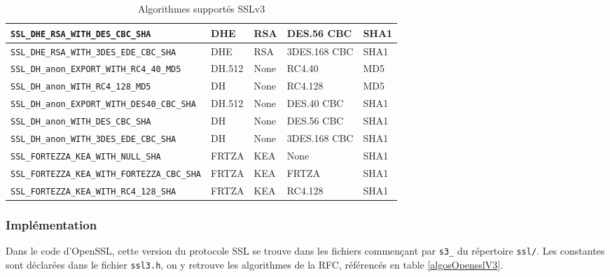 \begin{table}[H]
\begin{tabularx}{17cm}{|l|l|l|X|l|}
\hline
\verb+SSL_DHE_RSA_WITH_DES_CBC_SHA+ & DHE&RSA&DES.56 CBC&SHA1\\
\hline
\verb+SSL_DHE_RSA_WITH_3DES_EDE_CBC_SHA+ & DHE&RSA&3DES.168 CBC&SHA1\\
\hline 
\verb+SSL_DH_anon_EXPORT_WITH_RC4_40_MD5+ & DH.512&None&RC4.40&MD5\\
\hline
\verb+SSL_DH_anon_WITH_RC4_128_MD5+ & DH&None&RC4.128&MD5\\
\hline
\verb+SSL_DH_anon_EXPORT_WITH_DES40_CBC_SHA+ & DH.512&None&DES.40 CBC&SHA1\\
\hline
\verb+SSL_DH_anon_WITH_DES_CBC_SHA+& DH	&None	&DES.56	CBC&SHA1\\
\hline
\verb+SSL_DH_anon_WITH_3DES_EDE_CBC_SHA+ & DH	&None	&3DES.168 CBC&	SHA1\\
\hline
\verb+SSL_FORTEZZA_KEA_WITH_NULL_SHA+ & FRTZA&	KEA&	None&	SHA1\\
\hline
\verb+SSL_FORTEZZA_KEA_WITH_FORTEZZA_CBC_SHA+ & FRTZA & KEA & FRTZA& SHA1\\
\hline
\verb+SSL_FORTEZZA_KEA_WITH_RC4_128_SHA+ & FRTZA	&KEA&	RC4.128	&SHA1\\
\hline
\end{tabularx}
\caption{Algorithmes supportés SSLv3}
\label{algosV3}
\end{table}


\subsubsection{Implémentation}

Dans le code d'OpenSSL, cette version du protocole SSL se trouve dans les fichiers commençant par \verb+s3_+ du répertoire \verb+ssl/+. Les constantes sont déclarées dans le fichier \verb+ssl3.h+, on y retrouve les algorithmes de la RFC, référencés en table \ref{algosOpensslV3}.


